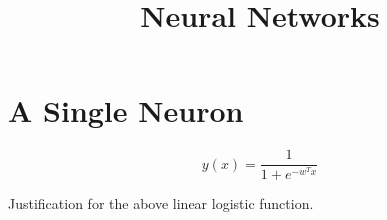 \documentclass{article}
\begin{document}
\title{Neural Networks}
\author{}
\date{}
\maketitle

\section{A Single Neuron}

\begin{equation}
y(x) = \frac{1}{1 + e^{-w^T x}}
\end{equation}

Justification for the above linear logistic function.
\end{document}
